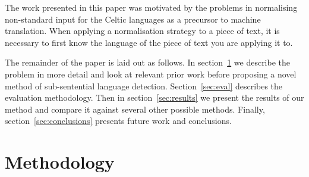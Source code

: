 \documentclass[11pt]{article}
\begin{document}
The work presented in this paper was motivated by the problems in normalising non-standard input
for the Celtic languages as a precursor to machine translation. When applying a normalisation 
strategy to a piece of text, it is necessary to first know the language of the piece of text you 
are applying it to.

The remainder of the paper is laid out as follows. In section~\ref{sec:method} we describe the problem
in more detail and look at relevant prior work before proposing a novel method of sub-sentential
language detection. Section~\ref{sec:eval} describes the evaluation methodology. Then in section~\ref{sec:results}
we present the results of our method and compare it against several other possible methods. Finally, section~\ref{sec:conclusions}
presents future work and conclusions.

\section{Methodology}
\label{sec:method}



%
%

\end{document}
